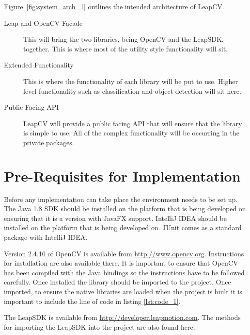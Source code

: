 \documentclass[11pt,oneside]{report}
\begin{document}
			Figure~\ref{fig:system_arch_1} outlines the intended architecture of LeapCV.
			\begin{description}
			\item[Leap and OpenCV Facade] This will bring the two libraries, being OpenCV and the LeapSDK, together.
			This is where most of the utility style functionality will sit.
			\item[Extended Functionality] This is where the functionality of each library will be put to use.
			Higher level functionality such as classification and object detection will sit here.
			\item[Public Facing API] LeapCV will provide a public facing API that will ensure that the library is simple to use.
			All of the complex functionality will be occurring in the private packages.
			\end{description}
			\clearpage
	\section{Pre-Requisites for Implementation}
		Before any implementation can take place the environment needs to be set up.
		The Java 1.8 SDK should be installed on the platform that is being developed on ensuring that it is a version with JavaFX support.
		IntelliJ IDEA should be installed on the platform that is being developed on.
		JUnit comes as a standard package with IntelliJ IDEA.
		
		Version 2.4.10 of OpenCV is available from \url{http://www.opencv.org}.
		Instructions for installation are also available there.
		It is important to ensure that OpenCV has been compiled with the Java bindings so the instructions have to be followed carefully.
		Once installed the library should be imported to the project. %
		Once imported, to ensure the native libraries are loaded when the project is built it is important to include the line of code in listing \ref{lst:code_1}.
		
				
		The LeapSDK is available from \url{http://developer.leapmotion.com}.
		The methods for importing the LeapSDK into the project are also found here.
\end{document}
